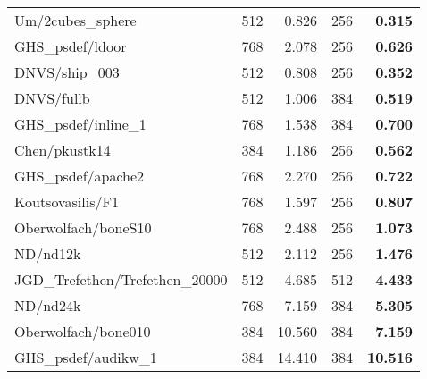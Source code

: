 \begin{tabular}{l|rr|rr}
  Um/2cubes\_sphere               & 512                       & 0.826     & 256 & \bf 0.315  \\
  GHS\_psdef/ldoor                & 768                       & 2.078     & 256 & \bf 0.626  \\
  DNVS/ship\_003                  & 512                       & 0.808     & 256 & \bf 0.352  \\
  DNVS/fullb                      & 512                       & 1.006     & 384 & \bf 0.519  \\
  GHS\_psdef/inline\_1            & 768                       & 1.538     & 384 & \bf 0.700  \\
  Chen/pkustk14                   & 384                       & 1.186     & 256 & \bf 0.562  \\
  GHS\_psdef/apache2              & 768                       & 2.270     & 256 & \bf 0.722  \\
  Koutsovasilis/F1                & 768                       & 1.597     & 256 & \bf 0.807  \\
  Oberwolfach/boneS10             & 768                       & 2.488     & 256 & \bf 1.073  \\
  ND/nd12k                        & 512                       & 2.112     & 256 & \bf 1.476  \\
  JGD\_Trefethen/Trefethen\_20000 & 512                       & 4.685     & 512 & \bf 4.433  \\
  ND/nd24k                        & 768                       & 7.159     & 384 & \bf 5.305  \\
  Oberwolfach/bone010             & 384                       & 10.560    & 384 & \bf 7.159  \\
  GHS\_psdef/audikw\_1            & 384                       & 14.410    & 384 & \bf 10.516 \\  
  \hline
\end{tabular}
